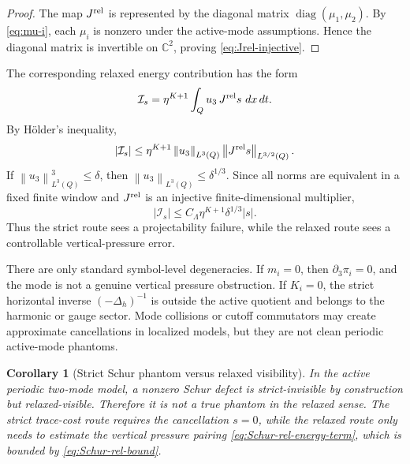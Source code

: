 \documentclass[11pt]{article}
\numberwithin{equation}{section}
\newtheorem{corollary}[theorem]{Corollary}
\DeclareMathOperator{\diag}{diag}
\newcommand{\dxdt}{\,dx\,dt}
\newcommand{\norm}[2]{\left\|#1\right\|_{#2}}
\begin{document}
\begin{proof}
The map \(J^{\rm rel}\) is represented by the diagonal matrix \(\diag(\mu_1,\mu_2)\).  By \eqref{eq:mu-i}, each \(\mu_i\) is nonzero under the active-mode assumptions.  Hence the diagonal matrix is invertible on \(\mathbb C^2\), proving \eqref{eq:Jrel-injective}.
\end{proof}

The corresponding relaxed energy contribution has the form
\begin{equation}\label{eq:Schur-rel-energy-term}
        \mathcal I_s
        =\eta^{K+1}\int_Q u_3\,J^{\rm rel}s\,\dxdt.
\end{equation}
By H\"older's inequality,
\begin{equation}\label{eq:Schur-rel-Holder}
        |\mathcal I_s|
        \le \eta^{K+1}\norm{u_3}{L^3(Q)}
        \norm{J^{\rm rel}s}{L^{3/2}(Q)}.
\end{equation}
If \(\norm{u_3}{L^3(Q)}^3\le\delta\), then \(\norm{u_3}{L^3(Q)}\le\delta^{1/3}\).  Since all norms are equivalent in a fixed finite window and \(J^{\rm rel}\) is an injective finite-dimensional multiplier,
\begin{equation}\label{eq:Schur-rel-bound}
        \boxed{\;
        |\mathcal I_s|
        \le C_\Lambda\eta^{K+1}\delta^{1/3}|s|.
        \;}
\end{equation}
Thus the strict route sees a projectability failure, while the relaxed route sees a controllable vertical-pressure error.

There are only standard symbol-level degeneracies.  If \(m_i=0\), then \(\partial_3\pi_i=0\), and the mode is not a genuine vertical pressure obstruction.  If \(K_i=0\), the strict horizontal inverse \((-\Delta_h)^{-1}\) is outside the active quotient and belongs to the harmonic or gauge sector.  Mode collisions or cutoff commutators may create approximate cancellations in localized models, but they are not clean periodic active-mode phantoms.

\begin{corollary}[Strict Schur phantom versus relaxed visibility]\label{cor:strict-phantom-rel-visible}
In the active periodic two-mode model, a nonzero Schur defect is strict-invisible by construction but relaxed-visible.  Therefore it is not a true phantom in the relaxed sense.  The strict trace-cost route requires the cancellation \(s=0\), while the relaxed route only needs to estimate the vertical pressure pairing \eqref{eq:Schur-rel-energy-term}, which is bounded by \eqref{eq:Schur-rel-bound}.
\end{corollary}
\end{document}
